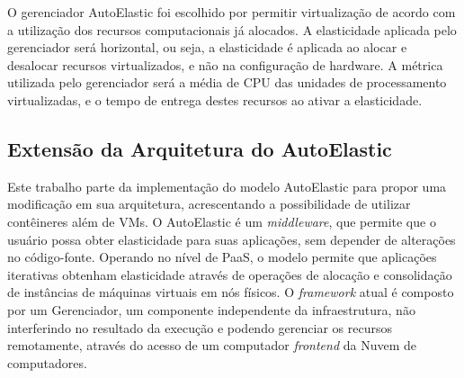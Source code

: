 \documentclass[twoside,english,brazilian]{UNISINOSartigo}
\begin{document}
O gerenciador AutoElastic foi escolhido por permitir virtualização de acordo com a utilização dos recursos computacionais já alocados. A elasticidade aplicada pelo gerenciador será horizontal, ou seja, a elasticidade é aplicada ao alocar e desalocar recursos virtualizados, e não na configuração de hardware. A métrica utilizada pelo gerenciador será a média de CPU das unidades de processamento virtualizadas, e o tempo de entrega destes recursos ao ativar a elasticidade.

\subsection{Extensão da Arquitetura do AutoElastic}
\label{arquitetura}
Este trabalho parte da implementação do modelo AutoElastic para propor uma modificação em sua arquitetura, acrescentando a possibilidade de utilizar contêineres além de VMs. O AutoElastic é um \textit{middleware}, que permite que o usuário possa obter elasticidade para suas aplicações, sem depender de alterações no código-fonte. Operando no nível de PaaS, o modelo permite que aplicações iterativas obtenham elasticidade através de operações de alocação e consolidação de instâncias de máquinas virtuais em nós físicos. O \textit{framework} atual é composto por um Gerenciador, um componente independente da infraestrutura, não interferindo no resultado da execução e podendo gerenciar os recursos remotamente, através do acesso de um computador \textit{frontend} da Nuvem de computadores.
\end{document}
